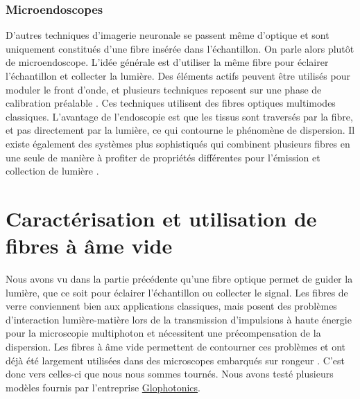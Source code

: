 \subsubsection{Microendoscopes}


D'autres techniques d'imagerie neuronale se passent même d'optique et sont uniquement constitués d'une fibre insérée dans l'échantillon. On parle alors plutôt de microendoscope. L'idée générale est d'utiliser la même fibre pour éclairer l'échantillon et collecter la lumière. Des éléments actifs peuvent être utilisés pour moduler le front d'onde, et plusieurs techniques reposent sur une phase de calibration préalable \cite{papadopoulos_high-resolution_2013}\cite{ohayon_minimally_2018}\cite{turtaev_high-fidelity_2018}. Ces techniques utilisent des fibres optiques multimodes classiques. L'avantage de l'endoscopie est que les tissus sont traversés par la fibre, et pas directement par la lumière, ce qui contourne le phénomène de dispersion. Il existe également des systèmes plus sophistiqués qui combinent plusieurs fibres en une seule de manière à profiter de propriétés différentes pour l'émission et collection de lumière \cite{andresen_two-photon_2013}\cite{kudlinski_double_2020}\cite{lombardini_high-resolution_2018}.



\section{Caractérisation et utilisation de fibres à âme vide}

Nous avons vu dans la partie précédente qu'une fibre optique permet de guider la lumière, que ce soit pour éclairer l'échantillon ou collecter le signal. Les fibres de verre conviennent bien aux applications classiques, mais posent des problèmes d'interaction lumière-matière lors de la transmission d'impulsions à haute énergie pour la microscopie multiphoton et nécessitent une précompensation de la dispersion. Les fibres à âme vide permettent de contourner ces problèmes et ont déjà été largement utilisées dans des microscopes embarqués sur rongeur \cite{tai_two-photon_2004} \cite{flusberg_vivo_2005} \cite{engelbrecht_ultra-compact_2008} \cite{piyawattanametha_vivo_2009} \cite{choi_improving_2014} \cite{klioutchnikov_three-photon_2020}. C'est donc vers celles-ci que nous nous sommes tournés. Nous avons testé plusieurs modèles fournis par l'entreprise \href{http://www.glophotonics.fr/}{Glophotonics}.

